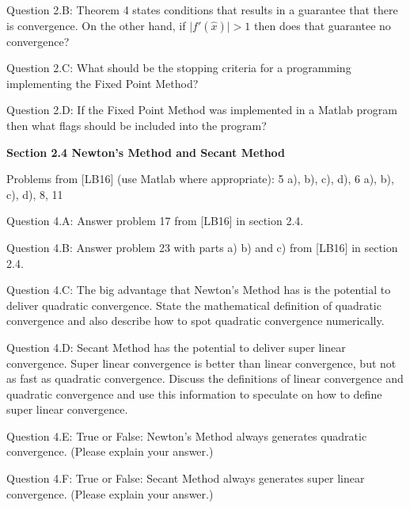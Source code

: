 \documentclass{article}
\renewcommand{\cite}[1]{[#1]}
\def\ds{\displaystyle}
\begin{document}
 \medskip \par \noindent
%
Question 2.B: Theorem 4 states conditions that results in a guarantee that there is convergence. On the other hand, if $\ds \vert f ' (\hat x) \vert > 1$ then does that guarantee no convergence?  
 \medskip \par \noindent
%
Question 2.C: What should be the stopping criteria for a programming implementing the Fixed Point Method?
\medskip \par \noindent
%
Question 2.D: If the Fixed Point Method was implemented in a Matlab program then what flags should be included into the program? 

\par \bigskip \par
{\bf Section 2.4 Newton's Method and Secant Method} \\  \par \medskip \noindent

\par \noindent
Problems from \cite{LB16} (use Matlab where appropriate): 5 a), b), c), d), 6 a), b), c), d), 8, 11
\par \medskip \noindent
%
Question 4.A: Answer problem 17 from \cite{LB16} in section 2.4. 
\medskip \par \noindent
%
Question 4.B: Answer problem 23 with parts a) b) and c) from \cite{LB16} in section 2.4. 
  \medskip \par \noindent
%
Question 4.C: The big advantage that Newton's Method has is the potential to deliver quadratic convergence. State the mathematical definition of quadratic convergence and also describe how to spot quadratic convergence numerically. 
  
\medskip \par \noindent
%
Question 4.D: Secant Method has the potential to deliver super linear convergence. Super linear convergence is better than linear convergence, but not as fast as quadratic convergence. Discuss the definitions of linear convergence and quadratic convergence and use this information to speculate on how to define super linear convergence.   

\medskip \par \noindent
%
Question 4.E: True or False: Newton's Method always generates quadratic convergence. (Please explain your answer.)  

\medskip \par \noindent
%
Question 4.F: True or False: Secant Method always generates super linear convergence. (Please explain your answer.)  
\end{document}
